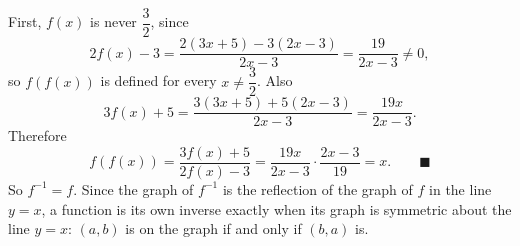 First, $f(x)$ is never $\dfrac{3}{2}$, since
\[
2f(x)-3=\dfrac{2(3x+5)-3(2x-3)}{2x-3}=\dfrac{19}{2x-3}\ne0 ,
\]
so $f(f(x))$ is defined for every $x\ne\dfrac{3}{2}$. Also
\[
3f(x)+5=\dfrac{3(3x+5)+5(2x-3)}{2x-3}=\dfrac{19x}{2x-3}.
\]
Therefore
\[
f(f(x))=\dfrac{3f(x)+5}{2f(x)-3}=\dfrac{19x}{2x-3}\cdot\dfrac{2x-3}{19}=x. \qquad\blacksquare
\]
So $f^{-1}=f$. Since the graph of $f^{-1}$ is the reflection of the graph of $f$ in the line $y=x$, a function is its own inverse exactly when its graph is symmetric about the line $y=x$: $(a,b)$ is on the graph if and only if $(b,a)$ is.
